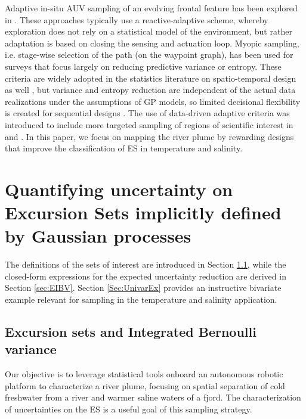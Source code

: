 \documentclass[aoas]{imsart}
\begin{document}
Adaptive in-situ AUV sampling of an evolving frontal feature has been
explored in \cite{fronts11,Zhang2012,Pinto2018,costa19}. These
approaches typically use a reactive-adaptive scheme, whereby
exploration does not rely on a statistical model of the environment,
but rather adaptation is based on closing the sensing and actuation
loop. Myopic sampling, i.e. stage-wise selection of the path (on the
waypoint graph), has been used for surveys
\citep{singh2009efficient,Binney2013} that focus largely on reducing
predictive variance or entropy. These criteria are widely adopted in
the statistics literature on spatio-temporal design as well
\cite{bueso1998state,zidek2019monitoring}, but variance and entropy
reduction are independent of the actual data realizations under the
assumptions of GP models, so limited decisional flexibility is created
for sequential designs . The use of data-driven adaptive criteria
was introduced to include more targeted sampling of regions of
scientific interest in \cite{Low2009} and \cite{fossuminformation}. In
this paper, we focus on mapping the river plume by rewarding designs
that improve the classification of ES in temperature and salinity.


\section{Quantifying uncertainty on Excursion Sets implicitly defined by Gaussian processes}
\label{sec:ESEP}

The definitions of the sets of interest are introduced in Section \ref{sec:ES}, while the closed-form expressions for the expected uncertainty reduction are derived in Section \ref{sec:EIBV}. Section \ref{Sec:UnivarEx} provides an instructive bivariate example relevant for sampling in the temperature and salinity application.

\subsection{Excursion sets and Integrated Bernoulli variance}
\label{sec:ES}

Our objective is to leverage statistical tools onboard an autonomous
robotic platform to characterize a river plume, focusing on spatial
separation of cold freshwater from a river and warmer saline waters
of a fjord. The characterization of uncertainties on the ES is a
useful goal of this sampling strategy.
\end{document}
